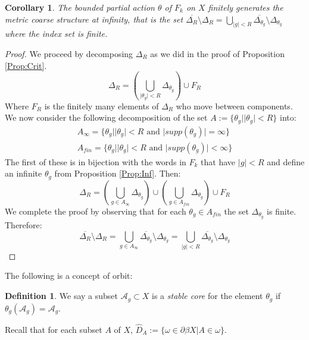 \documentclass[11pt]{amsart}
\theoremstyle{plain}
\newtheorem{corollary}[theorem]{Corollary}%
\theoremstyle{definition}%
\newtheorem{definition}[theorem]{Definition}%
\theoremstyle{remark}%
\begin{document}
\begin{corollary}
The bounded partial action $\theta$ of $F_{k}$ on $X$ finitely generates the metric coarse structure at infinity, that is the set $\overline{\Delta_{R}}\setminus \Delta_{R} = \bigcup_{\vert g \vert < R}\overline{\Delta_{\theta_{g}}}\setminus \Delta_{\theta_{g}}$ where the index set is finite.
\end{corollary}
\begin{proof}
We proceed by decomposing $\Delta_{R}$ as we did in the proof of Proposition \ref{Prop:Crit}.
\begin{equation*}
\Delta_{R}=(\bigcup_{\vert \theta_{g} \vert < R}\Delta_{\theta_{g}})\cup F_{R}
\end{equation*}
Where $F_{R}$ is the finitely many elements of $\Delta_{R}$ who move between components. We now consider the following decomposition of the set $A:=\lbrace \theta_{g} | \vert \theta_{g}\vert < R\rbrace$ into:
\begin{eqnarray*}
A_{\infty}=\lbrace \theta_{g} | \vert \theta_{g} \vert < R \mbox{ and } \vert supp(\theta_{g})\vert = \infty \rbrace \\
A_{fin}=\lbrace \theta_{g} | \vert \theta_{g} \vert < R\mbox{ and } \vert supp(\theta_{g})\vert < \infty \rbrace
\end{eqnarray*}
The first of these is in bijection with the words in $F_{k}$ that have $\vert g \vert < R$ and define an infinite $\theta_{g}$ from Proposition \ref{Prop:Inf}. Then:
\begin{equation*}
\Delta_{R}=(\bigcup_{g \in A_{\infty}}\Delta_{\theta_{g}})\cup (\bigcup_{g \in A_{fin}}\Delta_{\theta_{g}}) \cup F_{R}
\end{equation*}
We complete the proof by observing that for each $\theta_{g} \in A_{fin}$ the set $\Delta_{\theta_{g}}$ is finite. Therefore:
\begin{equation*}
\overline{\Delta_{R}}\setminus \Delta_{R} = \bigcup_{g \in A_{\infty}}\overline{\Delta_{\theta_{g}}}\setminus \Delta_{\theta_{g}}= \bigcup_{\vert g \vert < R}\overline{\Delta_{\theta_{g}}}\setminus \Delta_{\theta_{g}}
\end{equation*}\end{proof}

The following is a concept of orbit:
\begin{definition}
We say a subset $\mathcal{A}_{g} \subset X$ is a \textit{stable core} for the element $\theta_{g}$ if $\theta_{g}(\mathcal{A}_{g})=\mathcal{A}_{g}$. 
\end{definition}
Recall that for each subset $A$ of $X$, $\widehat{D}_{A}:=\lbrace \omega \in \partial \beta X | A \in \omega \rbrace$.
\end{document}
